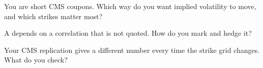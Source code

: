 \begin{interviewq}\label{iq:rc:convexity-adjustments-and-constant-maturity-products:4}
You are short CMS coupons. Which way do you want implied volatility to move, and
which strikes matter most?
\end{interviewq}

\begin{interviewq}\label{iq:rc:convexity-adjustments-and-constant-maturity-products:5}
A  depends on a correlation that is not quoted. How do you mark
and hedge it?
\end{interviewq}

\begin{interviewq}\label{iq:rc:convexity-adjustments-and-constant-maturity-products:6}
Your CMS replication gives a different number every time the strike grid
changes. What do you check?
\end{interviewq}
